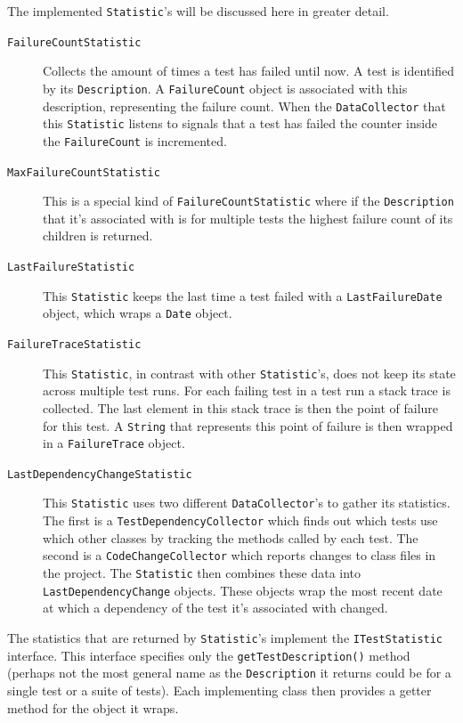 \documentclass[i2]{oss}
\newcommand{\class}[1]{\texttt{#1}}
\newcommand{\method}[1]{\texttt{#1}}
\begin{document}
The implemented \class{Statistic}'s will be discussed here in greater 
detail.
\begin{description}

\item [\class{FailureCountStatistic}] Collects the amount of times a test 
has failed until now.
A test is identified by its \class{Description}.
A \class{FailureCount} object is associated with this description,
representing the failure count.
When the \class{DataCollector} that this \class{Statistic} listens to
signals that a test has failed the counter inside the 
\class{FailureCount} is incremented.

\item [\class{MaxFailureCountStatistic}] This is a special kind of 
\class{FailureCountStatistic} where if the \class{Description} that it's
associated with is for multiple tests the highest failure count of its 
children is returned.

\item [\class{LastFailureStatistic}] This \class{Statistic} keeps the 
last time a test failed with a \class{LastFailureDate} object, which
wraps a \class{Date} object.

\item [\class{FailureTraceStatistic}] This \class{Statistic}, in contrast
with other \class{Statistic}'s, does not keep its state across multiple
test runs.
For each failing test in a test run a stack trace is collected. 
The last element in this stack trace is then the point of failure for 
this test.
A \class{String} that represents this point of failure is then wrapped
in a \class{FailureTrace} object.

\item [\class{LastDependencyChangeStatistic}] This \class{Statistic} uses
two different \class{DataCollector}'s to gather its statistics.
The first is a \class{TestDependencyCollector} which finds out which 
tests use which other classes by tracking the methods called by each
test.
The second is a \class{CodeChangeCollector} which reports changes to
class files in the project.
The \class{Statistic} then combines these data into 
\class{LastDependencyChange} objects.
These objects wrap the most recent date at which a dependency of the 
test it's associated with changed.

\end{description}

The statistics that are returned by \class{Statistic}'s implement the
\class{ITestStatistic} interface.
This interface specifies only the \method{getTestDescription()} method 
(perhaps not the most general name as the \class{Description} it returns
could be for a single test or a suite of tests).
Each implementing class then provides a getter method for the object it
wraps.
\end{document}
